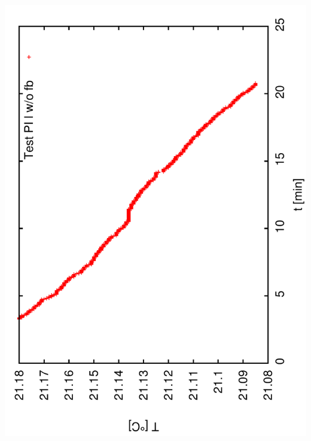 \documentclass[a4paper,11pt]{book}
\begin{document}
\includegraphics[angle=-90,scale=0.15]{image51a.pdf}\\
\end{document}

